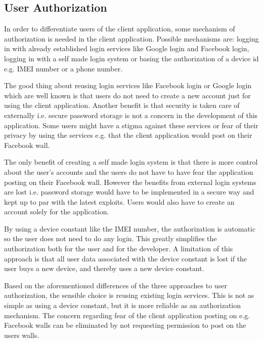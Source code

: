 \subsection{User Authorization}
\label{par:user_authorization}

In order to differentiate users of the client application, some mechanism of authorization is needed in the client application. Possible mechanisms are: logging in with already established login services like Google login and Facebook login, logging in with a self made login system or basing the authorization of a device id e.g. IMEI number or a phone number.

The good thing about reusing login services like Facebook login or Google login which are well known is that users do not need to create a new account just for using the client application. Another benefit is that security is taken care of externally i.e. secure password storage is not a concern in the development of this application. Some users might have a stigma against these services or fear of their privacy by using the services e.g. that the client application would post on their Facebook wall.

The only benefit of creating a self made login system is that there is more control about the user's accounts and the users do not have to have fear the application posting on their Facebook wall. However the benefits from external login systems are lost i.e. password storage would have to be implemented in a secure way and kept up to par with the latest exploits. Users would also have to create an account solely for the application.

By using a device constant like the IMEI number, the authorization is automatic so the user does not need to do any login. This greatly simplifies the authorization both for the user and for the developer. A limitation of this approach is that all user data associated with the device constant is lost if the user buys a new device, and thereby uses a new device constant.

Based on the aforementioned differences of the three approaches to user authorization, the sensible choice is reusing existing login services. This is not as simple as using a device constant, but it is more reliable as an authorization mechanism. The concern regarding fear of the client application posting on e.g. Facebook walls can be eliminated by not requesting permission to post on the users walls.
